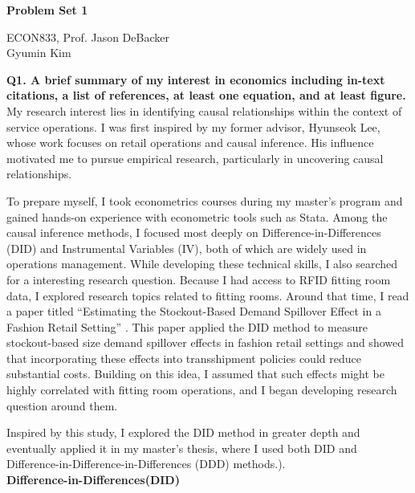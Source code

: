 \documentclass[letterpaper,12pt]{article}
\theoremstyle{definition}
\begin{document}
	
\begin{center}
	\textbf{\large Problem Set 1} \\[2mm]
\end{center}

\begin{flushleft}
	ECON833, Prof. Jason DeBacker \\ 
	Gyumin Kim
\end{flushleft}

\vspace{5mm}

\textbf{Q1. A brief summary of my interest in economics including in-text citations, a list of references, at least one equation, and at least figure.}\\[2mm]

My research interest lies in identifying causal relationships within the context of service operations. I was first inspired by my former advisor, Hyunseok Lee, whose work focuses on retail operations and causal inference. His influence motivated me to pursue empirical research, particularly in uncovering causal relationships.

To prepare myself, I took econometrics courses during my master’s program and gained hands-on experience with econometric tools such as Stata. Among the causal inference methods, I focused most deeply on Difference-in-Differences (DID) and Instrumental Variables (IV), both of which are widely used in operations management.\cite{Teck2017} While developing these technical skills, I also searched for a interesting research question. Because I had access to RFID fitting room data, I explored research topics related to fitting rooms. Around that time, I read a paper titled “Estimating the Stockout-Based Demand Spillover Effect in a Fashion Retail Setting” \cite{Li2023}. This paper applied the DID method to measure stockout-based size demand spillover effects in fashion retail settings and showed that incorporating these effects into transshipment policies could reduce substantial costs. Building on this idea, I assumed that such effects might be highly correlated with fitting room operations, and I began developing research question around them.

Inspired by this study, I explored the DID method in greater depth and eventually applied it in my master’s thesis, where I used both DID and Difference-in-Difference-in-Differences (DDD) methods.).\\[2mm]

 
\textbf{Difference-in-Differences(DID)}\\[2mm]
\end{document}
